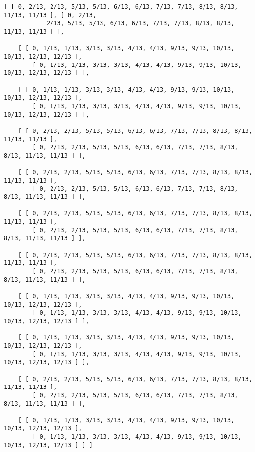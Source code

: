 \documentclass[a4paper,11pt]{report}
\begin{document}
{{\begin{Verbatim}[commandchars=!@|,fontsize=\small,frame=single,label=Example]
    [ [ 0, 2/13, 2/13, 5/13, 5/13, 6/13, 6/13, 7/13, 7/13, 8/13, 8/13, 11/13, 11/13 ], [ 0, 2/13, 
            2/13, 5/13, 5/13, 6/13, 6/13, 7/13, 7/13, 8/13, 8/13, 11/13, 11/13 ] ], 
  
    [ [ 0, 1/13, 1/13, 3/13, 3/13, 4/13, 4/13, 9/13, 9/13, 10/13, 10/13, 12/13, 12/13 ], 
        [ 0, 1/13, 1/13, 3/13, 3/13, 4/13, 4/13, 9/13, 9/13, 10/13, 10/13, 12/13, 12/13 ] ], 
  
    [ [ 0, 1/13, 1/13, 3/13, 3/13, 4/13, 4/13, 9/13, 9/13, 10/13, 10/13, 12/13, 12/13 ], 
        [ 0, 1/13, 1/13, 3/13, 3/13, 4/13, 4/13, 9/13, 9/13, 10/13, 10/13, 12/13, 12/13 ] ], 
  
    [ [ 0, 2/13, 2/13, 5/13, 5/13, 6/13, 6/13, 7/13, 7/13, 8/13, 8/13, 11/13, 11/13 ], 
        [ 0, 2/13, 2/13, 5/13, 5/13, 6/13, 6/13, 7/13, 7/13, 8/13, 8/13, 11/13, 11/13 ] ], 
  
    [ [ 0, 2/13, 2/13, 5/13, 5/13, 6/13, 6/13, 7/13, 7/13, 8/13, 8/13, 11/13, 11/13 ], 
        [ 0, 2/13, 2/13, 5/13, 5/13, 6/13, 6/13, 7/13, 7/13, 8/13, 8/13, 11/13, 11/13 ] ], 
  
    [ [ 0, 2/13, 2/13, 5/13, 5/13, 6/13, 6/13, 7/13, 7/13, 8/13, 8/13, 11/13, 11/13 ], 
        [ 0, 2/13, 2/13, 5/13, 5/13, 6/13, 6/13, 7/13, 7/13, 8/13, 8/13, 11/13, 11/13 ] ], 
  
    [ [ 0, 2/13, 2/13, 5/13, 5/13, 6/13, 6/13, 7/13, 7/13, 8/13, 8/13, 11/13, 11/13 ], 
        [ 0, 2/13, 2/13, 5/13, 5/13, 6/13, 6/13, 7/13, 7/13, 8/13, 8/13, 11/13, 11/13 ] ], 
  
    [ [ 0, 1/13, 1/13, 3/13, 3/13, 4/13, 4/13, 9/13, 9/13, 10/13, 10/13, 12/13, 12/13 ], 
        [ 0, 1/13, 1/13, 3/13, 3/13, 4/13, 4/13, 9/13, 9/13, 10/13, 10/13, 12/13, 12/13 ] ], 
  
    [ [ 0, 1/13, 1/13, 3/13, 3/13, 4/13, 4/13, 9/13, 9/13, 10/13, 10/13, 12/13, 12/13 ], 
        [ 0, 1/13, 1/13, 3/13, 3/13, 4/13, 4/13, 9/13, 9/13, 10/13, 10/13, 12/13, 12/13 ] ], 
  
    [ [ 0, 2/13, 2/13, 5/13, 5/13, 6/13, 6/13, 7/13, 7/13, 8/13, 8/13, 11/13, 11/13 ], 
        [ 0, 2/13, 2/13, 5/13, 5/13, 6/13, 6/13, 7/13, 7/13, 8/13, 8/13, 11/13, 11/13 ] ], 
  
    [ [ 0, 1/13, 1/13, 3/13, 3/13, 4/13, 4/13, 9/13, 9/13, 10/13, 10/13, 12/13, 12/13 ], 
        [ 0, 1/13, 1/13, 3/13, 3/13, 4/13, 4/13, 9/13, 9/13, 10/13, 10/13, 12/13, 12/13 ] ] ]
  
\end{Verbatim}
 }

 
}
\end{document}
